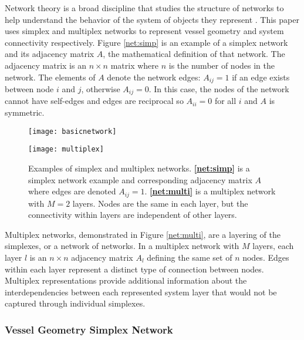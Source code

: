 \documentclass[preprint,12pt]{elsarticle}
\begin{document}
Network theory is a broad discipline that studies the structure of networks to help understand the behavior of the system of objects they represent \citep{Newman2003,Newman2010}. This paper uses simplex and multiplex networks to represent vessel geometry and system connectivity respectively. Figure \ref{net:simp} is an example of a simplex network and its adjacency matrix $A$, the mathematical definition of that network. The adjacency matrix is an $n\times n$ matrix where $n$ is the number of nodes in the network. The elements of $A$ denote the network edges: $A_{ij}=1$ if an edge exists between node $i$ and $j$, otherwise $A_{ij}=0$. In this case, the nodes of the network cannot have self-edges and edges are reciprocal so $A_{ii}=0$ for all $i$ and $A$ is symmetric.

\begin{figure}
	\begin{minipage}{.49\linewidth}
		\centering
		\texttt{[image: basicnetwork]}
		\label{net:simp}
	\end{minipage}%
	\begin{minipage}{.49\linewidth}
		\centering
		\texttt{[image: multiplex]}
		\label{net:multi}
	\end{minipage}
	\caption{Examples of simplex and multiplex networks. \textbf{\ref{net:simp}} is a simplex network example and corresponding adjacency matrix $A$ where edges are denoted $A_{ij}=1$. \textbf{\ref{net:multi}} is a multiplex network with $M=2$ layers. Nodes are the same in each layer, but the connectivity within layers are independent of other layers. }
	
	\label{fig:net}	
\end{figure}

Multiplex networks, demonstrated in Figure \ref{net:multi}, are a layering of the simplexes, or a network of networks. In a multiplex network with $M$ layers, each layer $l$ is an $n\times n$ adjacency matrix $A_l$ defining the same set of $n$ nodes. Edges within each layer represent a distinct type of connection between nodes. Multiplex representations provide additional information about the interdependencies between each represented system layer that would not be captured through individual simplexes.


\subsubsection{Vessel Geometry Simplex Network} \label{sec:vesselmodel}
\end{document}
